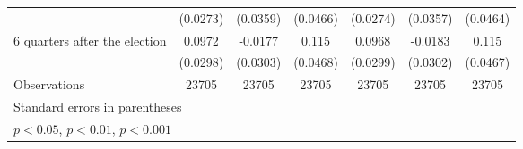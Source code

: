 \begin{table}[!ht]
\begin{tabular}{l*{6}{c}}
                    &    (0.0273)         &    (0.0359)         &    (0.0466)         &    (0.0274)         &    (0.0357)         &    (0.0464)         \\
[1em]
 6 quarters after the election&      0.0972\sym{**} &     -0.0177         &       0.115\sym{*}  &      0.0968\sym{**} &     -0.0183         &       0.115\sym{*}  \\
                    &    (0.0298)         &    (0.0303)         &    (0.0468)         &    (0.0299)         &    (0.0302)         &    (0.0467)         \\
\hline
Observations        &       23705         &       23705         &       23705         &       23705         &       23705         &       23705         \\
\hline\hline
\multicolumn{7}{l}{\footnotesize Standard errors in parentheses}\\
\multicolumn{7}{l}{\footnotesize \sym{*} \(p<0.05\), \sym{**} \(p<0.01\), \sym{***} \(p<0.001\)}\\
\end{tabular}
\end{table}
